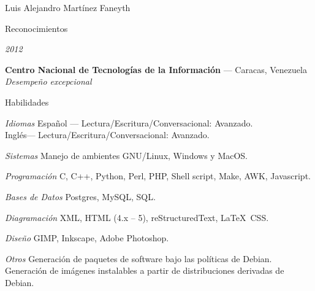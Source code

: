 \documentclass[letterpaper]{scrartcl}
\begin{document}
\begin{cv}{Luis Alejandro Mart\'inez Faneyth}
\begin{cvlist}{Reconocimientos}
\item[{\parbox[t]{6em}{\textit{\large{2012}}}}]{
	\parbox[t]{\linewidth}{
		\textbf{Centro Nacional de Tecnolog\'ias de la Informaci\'on} --- Caracas, Venezuela\\
		\textit{Desempe\~no excepcional}
	}
}
\end{cvlist}
\vspace{1em}

\begin{cvlist}{Habilidades}
\item[\textit{\large{Idiomas}}]{
	Espa\~nol --- Lectura/Escritura/Conversacional: Avanzado.\\
	Ingl\'es--- Lectura/Escritura/Conversacional: Avanzado.
}
\item[\textit{\large{Sistemas}}]{Manejo de ambientes GNU/Linux, Windows y MacOS.}
\item[\textit{\large{Programaci\'on}}]{C, C++, Python, Perl, PHP, Shell script, Make, AWK, Javascript.}
\item[\textit{\large{Bases de Datos}}]{Postgres, MySQL, SQL.}
\item[\textit{\large{Diagramaci\'on}}]{XML, HTML (4.x -- 5), reStructuredText, \LaTeX\, CSS.}
\item[\textit{\large{Dise\~no}}]{GIMP, Inkscape, Adobe Photoshop.}
\item[\textit{\large{Otros}}]{
	Generaci\'on de paquetes de software bajo las pol\'iticas de Debian.\\
	Generaci\'on de im\'agenes instalables a partir de distribuciones derivadas de Debian.
}
\end{cvlist}

\end{cv}
\end{document}
